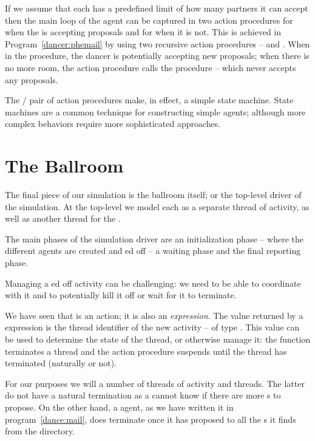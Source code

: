 If we assume that each \phemail has a predefined limit of how many partners it can accept then the main loop of the agent can be captured in two action procedures  for when the \phemail is accepting proposals and  for when it is not. This is achieved in Program~\vref{dancer:phemail} by using two recursive action procedures --  and . When in the  procedure, the dancer is potentially accepting new proposals; when there is no more room, the  action procedure calls the  procedure -- which never accepts any proposals.

The / pair of action procedures make, in effect, a simple state machine. State machines are a common technique for constructing simple agents; although more complex behaviors require more sophisticated approaches.

\section{The Ballroom}
\label{dance:ballroom}
The final piece of our simulation is the ballroom itself; or the top-level driver of the simulation. At the top-level we model each  as a separate thread of activity, as well as another thread for the . 

The main phases of the simulation driver are an initialization phase -- where the different agents are created and ed off -- a waiting phase and the final reporting phase.

Managing a ed off activity can be challenging: we need to be able to coordinate with it and to potentially kill it off or wait for it to terminate. 

We have seen that  is an action; it is also an \emph{expression}. The value returned by a  expression is the thread identifier of the new activity -- of type . This value can be used to determine the state of the thread, or otherwise manage it: the  function terminates a thread and the  action procedure suspends until the thread has terminated (naturally or not).

For our purposes we will  a number of \mail threads of activity and \phemail threads. The latter do not have a natural termination as a \phemail cannot know if there are more \mail{}s to propose. On the other hand, a \mail agent, as we have written it in program~\vref{dance:mail}, does terminate once it has proposed to all the \phemail{}s it finds from the directory.

